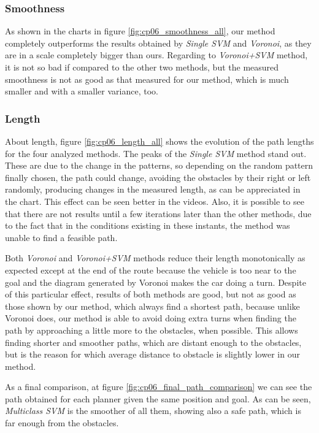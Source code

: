 \subsubsection{Smoothness}\label{ch:chapter06_02_02_02}

As shown in the charts in figure \ref{fig:cp06_smoothness_all}, our method completely outperforms the results obtained by \textit{Single \ac{SVM}} and \textit{Voronoi}, as they are in a scale completely bigger than ours. Regarding to \textit{Voronoi+\ac{SVM}} method, it is not so bad if compared to the other two methods, but the measured smoothness is not as good as that measured for our method, which is much smaller and with a smaller variance, too.

\subsubsection{Length}\label{ch:chapter06_02_02_03}

About length, figure \ref{fig:cp06_length_all} shows the evolution of the path lengths for the four analyzed methods. The peaks of the \textit{Single \ac{SVM}} method stand out. These are due to the change in the patterns, so depending on the random pattern finally chosen, the path could change, avoiding the obstacles by their right or left randomly, producing changes in the measured length, as can be appreciated in the chart. This effect can be seen better in the videos. Also, it is possible to see that there are not results until a few iterations later than the other methods, due to the fact that in the conditions existing in these instants, the method was unable to find a feasible path.

Both \textit{Voronoi} and \textit{Voronoi+\ac{SVM}} methods reduce their length monotonically as expected except at the end of the route because the vehicle is too near to the goal and the diagram generated by Voronoi makes the car doing a turn. Despite of this particular effect, results of both methods are good, but not as good as those shown by our method, which always find a shortest path, because unlike Voronoi does, our method is able to avoid doing extra turns when finding the path by approaching a little more to the obstacles, when possible. This allows finding shorter and smoother paths, which are distant enough to the obstacles, but is the reason for which average distance to obstacle is slightly lower in our method.

As a final comparison, at figure \ref{fig:cp06_final_path_comparison} we can see the path obtained for each planner given the same position and goal. As can be seen, \textit{Multiclass \ac{SVM}} is the smoother of all them, showing also a safe path, which is far enough from the obstacles.

